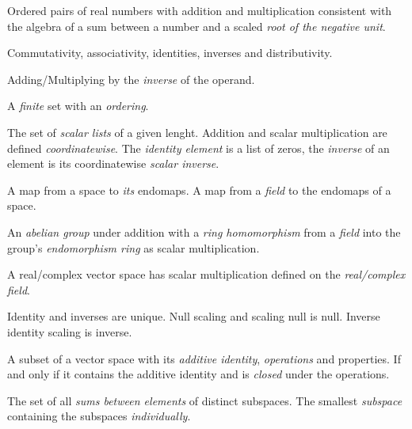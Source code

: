 

\usepackage[english]{babel}



\begin{multicols}{3}

  Ordered pairs of real numbers with addition and multiplication consistent with
  the algebra of a sum between a number and a scaled \textit{root of the negative unit}.

  Commutativity, associativity, identities, inverses and distributivity.

  Adding/Multiplying by the \textit{inverse} of the operand.

  A \textit{finite} set with an \textit{ordering}.

  The set of \textit{scalar lists} of a given lenght.
  Addition and scalar multiplication are defined \textit{coordinatewise}.
  The \textit{identity element} is a list of zeros, the \textit{inverse}
  of an element is its coordinatewise \textit{scalar inverse}.

  A map from a space to \textit{its} endomaps.
  A map from a \textit{field} to the endomaps of a space.

  An \textit{abelian group} under addition with a \textit{ring homomorphism} from a \textit{field} into the group's \textit{endomorphism ring} as scalar multiplication.

  A real/complex vector space has scalar multiplication defined on the \textit{real/complex field}.

  Identity and inverses are unique. Null scaling and scaling null is null. Inverse identity scaling is inverse.

  A subset of a vector space with its \textit{additive identity}, \textit{operations} and properties.
  If and only if it contains the additive identity and is \textit{closed} under the operations.

  The set of all \textit{sums between elements} of distinct subspaces.
  The smallest \textit{subspace} containing the subspaces \textit{individually}.


\end{multicols}
